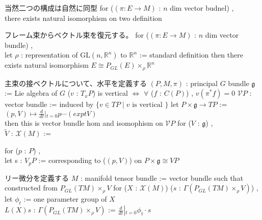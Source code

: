 \begin{Theorem}
\itemnote
  当然二つの構成は自然に同型
\itemprop
  for (\((\pi : E \to M)\) : \(n\) dim vector budnel) ,\\
  there exists natural isomorphism on two definition
\end{Theorem}

\begin{Theorem}
\itemnote
  フレーム束からベクトル束を復元する。
\itemprop
  for (\((\pi : E \to M)\) : \(n\) dim vector bundle) ,\\
  let \(\rho\) : representation of \(\text{GL}(n , \mathbb{R}^n)\) to \(\mathbb{R}^n\) := standard definition
  then there exists natural isomorphism \(E \cong P_{GL}(E) \times_{\rho} \mathbb{R}^n\)
\end{Theorem}

\begin{Definition}
\itemnote
  主束の接ベクトルについて、水平を定義する
\itemwhen \((P , M , \pi)\) : principal \(G\) bundle
\itemwhen \(\mathfrak{g}\) := Lie algebra of \(G\)
\itemdefi
  (\(v\) : \(T_{x}P\)) is vertical \(\iff\) \(\forall\) (\(f\) : \(C(P)\)) , \(v(\pi^*f) = 0\)
\itemdefi
  \(\mathcal{V}P\) : vector bundle := induced by \(\{v \in TP \mid v \text{ is vertical }\}\)
\itemprop
  let \(P \times \mathfrak{g} \to TP\) := \((p , V) \mapsto \frac{d}{dt} \left|_{t = 0} p \cdots (exp t V) \right.\) \\
  then this is vector bundle hom and isomophism on \(\mathcal{V}P\)
\itemdefi
  for (\(V\) : \(\mathfrak{g}\)) ,\\
  \(\tilde{V}\) : \(\mathcal{X}(M)\) :=
  \begin{indentblock}
    for (\(p\) : \(P\)) ,\\
    let s : \(V_p P\) := corresponding to (\((p , V)\)) on \(P \times \mathfrak{g} \cong VP\) 
  \end{indentblock} 
\end{Definition}

\begin{Definition}
\itemnote
  リー微分を定義する
\itemwhen \(M\) : manifold
\itemdefi
  tensor bundle := vector bundle such that constructed from \(P_{GL}(TM) \times_{\rho} V\)
\itemdefi
  for (\(X\) : \(\mathcal{X}(M)\)) (\(s\) : \(\Gamma(P_{GL}(TM) \times_{\rho} V)\)) ,\\
  let \(\phi_t\) := one parameter group of \(X\) \\
  \(L(X)s\) : \(\Gamma(P_{GL}(TM) \times_{\rho} V)\) := \(\frac{d}{dt} \left|_{t=0} \phi_t \cdot s \right.\)
\end{Definition}

